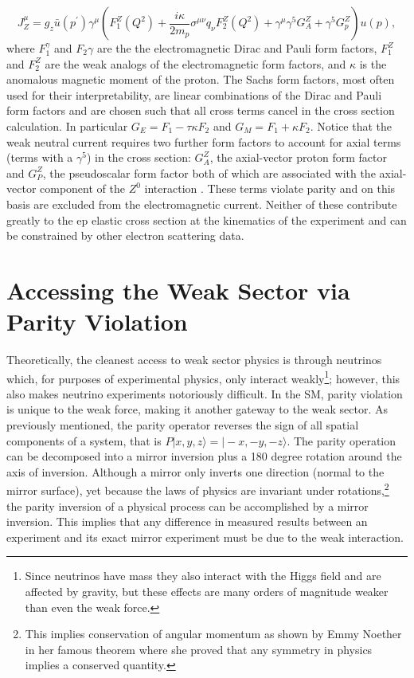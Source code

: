 \begin{equation}
J_{Z}^{\mu}=g_z\bar u(p^{\prime})\gamma^{\mu}\left( F_1^Z(Q^2) + \frac{i\kappa}{2m_p}\sigma^{\mu\nu}q_{\nu} F_2^Z(Q^2) + \gamma^{\mu}\gamma^5 G_A^Z + \gamma^5 G_p^Z\right)u(p),
\label{eq:proton_Z_current}
\end{equation} 
where $F_1^{\gamma}$ and $F_2{\gamma}$ are the the electromagnetic Dirac and Pauli form factors, $F_1^{Z}$ and $F_2^{Z}$ are the weak analogs of the electromagnetic form factors, and $\kappa$ is the anomalous magnetic moment of the proton. The Sachs form factors, most often used for their interpretability, are linear combinations of the Dirac and Pauli form factors and are chosen such that all cross terms cancel in the cross section calculation. In particular $G_E=F_1-\tau\kappa F_2$ and $G_M=F_1+\kappa F_2$. Notice that the weak neutral current requires two further form factors to account for axial terms (terms with a $\gamma^5$) in the cross section: $G_A^{Z}$, the axial-vector proton form factor and $G_P^{Z}$, the pseudoscalar form factor both of which are associated with the axial-vector component of the $Z^0$ interaction \cite{Arrington2007}. These terms violate parity and on this basis are excluded from the electromagnetic current. Neither of these contribute greatly to the ep elastic cross section at the kinematics of the \Qs experiment and can be constrained by other electron scattering data. 

\section{Accessing the Weak Sector via Parity Violation}
Theoretically, the cleanest access to weak sector physics is through neutrinos which, for purposes of experimental physics, only interact weakly\footnote{Since neutrinos have mass they also interact with the Higgs field and are affected by gravity, but these effects are many orders of magnitude weaker than even the weak force.};  however, this also makes neutrino experiments notoriously difficult. In the SM, parity violation is unique to the weak force, making it another gateway to the weak sector. As previously mentioned, the parity operator reverses the sign of all spatial components of a system, that is $P|x,y,z\rangle=|-x,-y,-z\rangle$. The parity operation can be decomposed into a mirror inversion plus a 180 degree rotation around the axis of inversion. Although a mirror only inverts one direction (normal to the mirror surface), yet because the laws of physics are invariant under rotations,\footnote{This implies conservation of angular momentum as shown by Emmy Noether in her famous theorem where she proved that any symmetry in physics implies a conserved quantity.} the parity inversion of a physical process can be accomplished by a mirror inversion. This implies that any difference in measured results between an experiment and its exact mirror experiment must be due to the weak interaction. 


